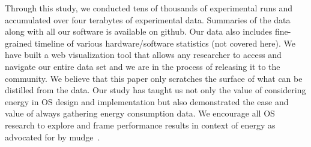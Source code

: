 \label{sec:dis}
Through this study, we conducted tens of thousands of experimental runs and accumulated over four terabytes of experimental data.  Summaries of the data along with all our software is available on github.  Our data also includes fine-grained timeline of various hardware/software statistics (not covered here).  We have built a web visualization tool that allows any researcher to access and navigate our entire data set and we are in the process of releasing it to the community. We believe that this paper only scratches the surface of what can be distilled from the data. Our study has taught us not only the value of considering energy in OS design and implementation but also demonstrated the ease and value of always gathering energy consumption data.  We encourage all OS research to explore and frame performance results in context of energy as advocated for by mudge~\cite{917539}.







